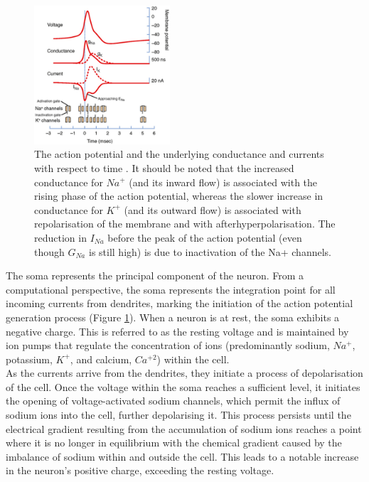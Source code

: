 \begin{figure}[htbp!] 
\centering    
\includegraphics[width=0.45\textwidth]{Chapter2/Figs/2b.png}
\caption[Spiking dynamics of a neuron.]{The action potential and the underlying conductance and currents with respect to time \cite{squire2012fundamental}. It should be noted that the increased conductance for $Na^+$ (and its inward flow) is associated with the rising phase of the action potential, whereas the slower increase in conductance for $K^+$ (and its outward flow) is associated with repolarisation of the membrane and with afterhyperpolarisation. The reduction in $I_{Na}$ before the peak of the action potential (even though $G_{Na}$ is still high) is due to inactivation of the Na+ channels.}
\label{fig:2b}
\end{figure}

\noindent The soma represents the principal component of the neuron. From a computational perspective, the soma represents the integration point for all incoming currents from dendrites, marking the initiation of the action potential generation process (Figure \ref{fig:2b}). When a neuron is at rest, the soma exhibits a negative charge. This is referred to as the resting voltage and is maintained by ion pumps that regulate the concentration of ions (predominantly sodium, $Na^+$, potassium, $K^+$, and calcium, $Ca^{+2}$) within the cell. \\

\noindent As the currents arrive from the dendrites, they initiate a process of depolarisation of the cell. Once the voltage within the soma reaches a sufficient level, it initiates the opening of voltage-activated sodium channels, which permit the influx of sodium ions into the cell, further depolarising it. This process persists until the electrical gradient resulting from the accumulation of sodium ions reaches a point where it is no longer in equilibrium with the chemical gradient caused by the imbalance of sodium within and outside the cell. This leads to a notable increase in the neuron's positive charge, exceeding the resting voltage. \\

